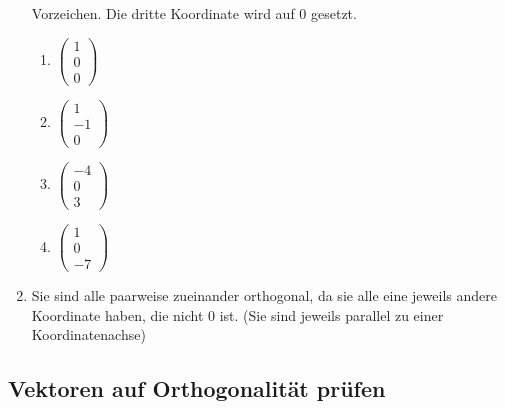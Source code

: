 \begin{enumerate}
  Vorzeichen. Die dritte Koordinate wird auf 0 gesetzt.
  \begin{multicols}{4}
    \begin{enumerate}
    \item $  
      \begin{pmatrix}
        1\\0\\0
      \end{pmatrix}
      $
    \item $  
      \begin{pmatrix}
        1\\-1\\0
      \end{pmatrix}
      $
    \item $  
      \begin{pmatrix}
        -4\\0\\3
      \end{pmatrix}
      $
    \item $  
      \begin{pmatrix}
        1\\0\\-7
      \end{pmatrix}
      $
    \end{enumerate}
  \end{multicols}
\item Sie sind alle paarweise zueinander orthogonal, da sie alle eine
  jeweils andere Koordinate haben, die nicht 0 ist. (Sie sind jeweils parallel
  zu einer Koordinatenachse)
\end{enumerate}
\subsection{Vektoren auf Orthogonalität prüfen}
	
